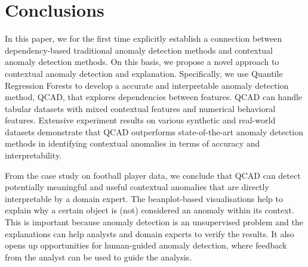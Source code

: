 \documentclass[pdflatex,sn-basic]{sn-jnl}%
\theoremstyle{thmstyleone}%
\theoremstyle{thmstyletwo}%
\theoremstyle{thmstylethree}%
\begin{document}
%

\section{Conclusions}
\label{sec:conclusion}

In this paper,  we for the first time explicitly establish a connection between dependency-based traditional anomaly detection methods and contextual anomaly detection methods. On this basis, we propose a novel approach to contextual anomaly detection and explanation. Specifically, we use Quantile Regression Forests to develop a accurate and interpretable anomaly detection method, QCAD, that explores dependencies between features. QCAD can handle tabular datasets with mixed contextual features and numerical behavioral features. Extensive experiment results on various synthetic and real-world datasets demonstrate that QCAD outperforms state-of-the-art anomaly detection methods in identifying contextual anomalies in terms of accuracy and interpretability. 

From the case study on football player data, we conclude that QCAD can detect potentially meaningful and useful contextual anomalies that are directly interpretable by a domain expert. The beanplot-based visualisations help to explain why a certain object is (not) considered an anomaly within its context. This is important because anomaly detection is an unsupervised problem and the explanations can help analysts and domain experts to verify the results. It also opens up opportunities for human-guided anomaly detection, where feedback from the analyst can be used to guide the analysis.
\end{document}
